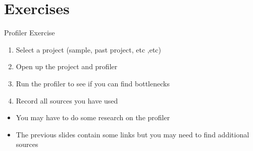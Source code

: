 \part{Exercises}
\frame{\partpage}

\begin{frame}{Profiler Exercise}
\begin{enumerate}
	\item Select a project (sample, past project, etc ,etc)
	\item Open up the project and profiler
	\item Run the profiler to see if you can find bottlenecks
	\item Record all sources you have used
\end{enumerate}
\begin{itemize}
	\item You may have to do some research on the profiler
	\item The previous slides contain some links but you may need to find additional sources 
\end{itemize}
\end{frame}